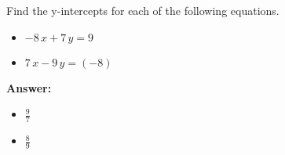  Find the y-intercepts for each of the following equations. \begin{itemize}\item \( -8 \, x + 7 \, y = 9 \)\item \( 7 \, x - 9 \, y = \left(-8\right) \)\end{itemize}

        \textbf{Answer:} \begin{itemize}\item \( \frac{9}{7} \)\item \( \frac{8}{9} \)\end{itemize}
